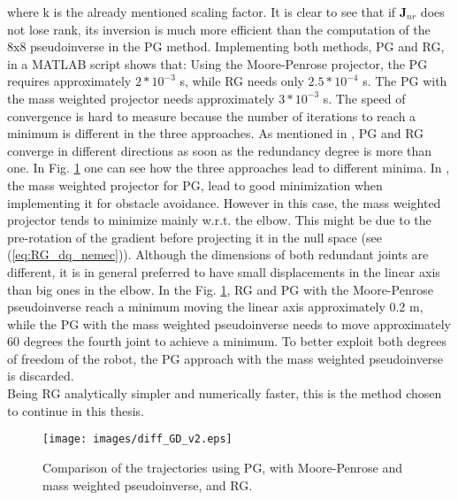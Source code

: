 where $\mathrm{k}$ is the already mentioned scaling factor. It is clear to see that if $\mathbf{J}_{nr}$ does not lose rank, its inversion is much more efficient than the computation of the $\mathrm{8x8}$ pseudoinverse in the PG method. Implementing both methods, PG and RG, in a MATLAB script shows that: Using the Moore-Penrose projector, the PG  requires approximately $2*10^{-3}$ s, while RG  needs only $2.5*10^{-4}$ s. The PG with the mass weighted projector needs approximately $3*10^{-3}$ s. The speed of convergence is hard to measure because the number of iterations to reach a minimum is different in the three approaches.
As mentioned in \cite{reduced_gradient}, PG and RG converge in different directions as soon as the redundancy degree is more than one. In Fig. \ref{fig:diff_GD_v2} one can see how the three approaches lead to different minima.  In \cite{Nemec_2}, the mass weighted projector for PG, lead to good minimization when implementing it for obstacle avoidance.  
However in this case, the mass weighted projector tends to minimize mainly w.r.t. the elbow. This might be due to the pre-rotation of the gradient before projecting it in the null space (see (\ref{eq:RG_dq_nemec})). Although the dimensions of both redundant joints are different, it is in general preferred to have small displacements in the linear axis than big ones in the elbow. In the Fig. \ref{fig:diff_GD_v2}, RG and PG with the Moore-Penrose pseudoinverse reach a minimum moving the linear axis approximately 0.2 m, while the PG with the mass weighted pseudoinverse needs to move approximately 60 degrees the fourth joint to achieve a minimum. To better exploit both degrees of freedom of the robot, the PG approach with the mass weighted pseudoinverse is discarded. 
 \\ 
Being RG analytically simpler and numerically faster, this is the method chosen to continue in this thesis. 


\begin{figure}[!htb]
	\centerline{
		\texttt{[image: images/diff\_GD\_v2.eps]}}
	\caption{Comparison of the trajectories using PG, with Moore-Penrose and mass weighted pseudoinverse, and RG.}
	\label{fig:diff_GD_v2}
\end{figure}









%

